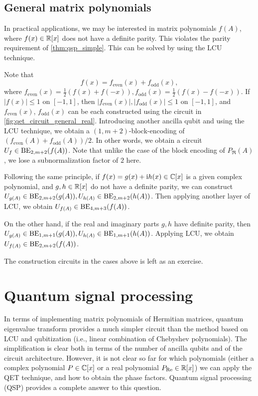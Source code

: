 \subsection{General matrix polynomials}\label{eqn:qet_general_polynomial}

In practical applications, we may be interested in matrix polynomials $f(A)$, where $f(x)\in\mathbb{R}[x]$ does not have a definite parity. This violates the parity requirement of \cref{thm:qsp_simple}.
This can be solved by using the LCU technique.

Note that
\begin{equation}
f(x)=f_{\mathrm{even}}(x)+f_{\mathrm{odd}}(x),
\end{equation}
where $f_{\mathrm{even}}(x)=\frac12(f(x)+f(-x)), f_{\mathrm{odd}}(x)=\frac12(f(x)-f(-x))$. 
If $|f(x)|\le 1$ on $[-1,1]$, then  $|f_{\mathrm{even}}(x)|,|f_{\mathrm{odd}}(x)|\le 1$ on $[-1,1]$, and $f_{\mathrm{even}}(x)$, $f_{\mathrm{odd}}(x)$ can be each constructed using the circuit in \cref{fig:qet_circuit_general_real}. 
Introducing another ancilla qubit and using the LCU technique, we obtain a $(1,m+2)$-block-encoding of $(f_{\mathrm{even}}(A)+f_{\mathrm{odd}}(A))/2$. In other words, we obtain a circuit $U_f\in \operatorname{BE}_{2,m+2}(f(A))$.
Note that unlike the case of the block encoding of $P_{\Re}(A)$, we lose a subnormalization factor of $2$ here.

Following the same principle, if $f(x)=g(x)+\mathrm{i} h(x)\in\mathbb{C}[x]$ is a given complex polynomial, and $g,h\in\mathbb{R}[x]$ do not have a definite parity, we can construct $U_{g(A)}\in\operatorname{BE}_{2,m+2}(g(A)),U_{h(A)}\in\operatorname{BE}_{2,m+2}(h(A))$.
Then applying another layer of LCU, we obtain $U_{f(A)}\in \operatorname{BE}_{4,m+3}(f(A))$.

On the other hand, if the real and imaginary parts $g,h$ have definite parity, then $U_{g(A)}\in\operatorname{BE}_{1,m+1}(g(A)),U_{h(A)}\in\operatorname{BE}_{1,m+1}(h(A))$.
Applying LCU, we obtain $U_{f(A)}\in \operatorname{BE}_{2,m+2}(f(A))$.


 
The construction circuits in the cases above is left as an exercise.



\section{Quantum signal processing}\label{sec:qsp}

In terms of implementing matrix polynomials of Hermitian matrices, quantum eigenvalue transform provides a much simpler circuit than the method based on LCU and qubitization (i.e., linear combination of Chebyshev polynomials).
The simplification is clear both in terms of the number of ancilla qubits and of the circuit architecture.
However, it is not clear so far for which polynomials (either a complex polynomial $P\in\mathbb{C}[x]$ or a real polynomial $P_{\operatorname{Re}}\in\mathbb{R}[x]$) we can apply the QET technique, and how to obtain the phase factors. 
Quantum signal processing (QSP) provides a complete answer to this question.

